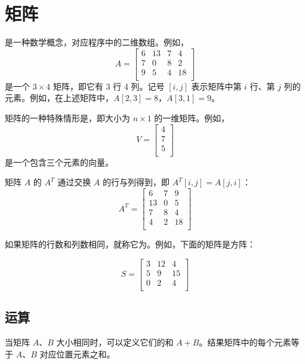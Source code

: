 \chapter{矩阵}


是一种数学概念，对应程序中的二维数组。例如，
\[
A = 
 \begin{bmatrix}
  6 & 13 & 7 & 4 \\
  7 & 0 & 8 & 2 \\
  9 & 5 & 4 & 18 \\
 \end{bmatrix}
\]
是一个 $3 \times 4$ 矩阵，即它有 3 行 4 列。记号 $[i,j]$ 表示矩阵中第 $i$ 行、第 $j$ 列的元素。例如，在上述矩阵中，$A[2,3]=8$，$A[3,1]=9$。


矩阵的一种特殊情形是，即大小为 $n \times 1$ 的一维矩阵。例如，
\[
V =
\begin{bmatrix}
4 \\
7 \\
5 \\
\end{bmatrix}
\]
是一个包含三个元素的向量。


矩阵 $A$ 的 $A^T$ 通过交换 $A$ 的行与列得到，即 $A^T[i,j]=A[j,i]$：
\[
A^T = 
 \begin{bmatrix}
  6 & 7 & 9 \\
  13 & 0 & 5 \\
  7 & 8 & 4 \\
  4 & 2 & 18 \\
 \end{bmatrix}
\]


如果矩阵的行数和列数相同，就称它为。例如，下面的矩阵是方阵：

\[
S = 
 \begin{bmatrix}
  3 & 12 & 4  \\
  5 & 9 & 15  \\
  0 & 2 & 4 \\
 \end{bmatrix}
\]

\section{运算}

当矩阵 $A$、$B$ 大小相同时，可以定义它们的和 $A+B$。结果矩阵中的每个元素等于 $A$、$B$ 对应位置元素之和。

